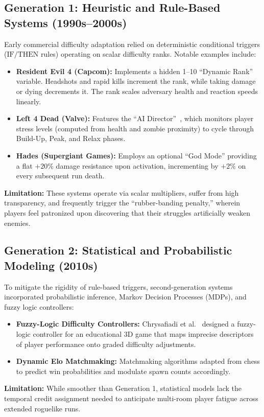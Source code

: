 \subsection{Generation 1: Heuristic and Rule-Based Systems (1990s--2000s)}
Early commercial difficulty adaptation relied on deterministic conditional triggers ($\text{IF}/\text{THEN}$ rules) operating on scalar difficulty ranks. Notable examples include:
\begin{itemize}
    \item \textbf{Resident Evil 4 (Capcom):} Implements a hidden 1--10 ``Dynamic Rank'' variable. Headshots and rapid kills increment the rank, while taking damage or dying decrements it. The rank scales adversary health and reaction speeds linearly.
    \item \textbf{Left 4 Dead (Valve):} Features the ``AI Director''~\cite{zohaib2018dynamic, mortazavi2024dda}, which monitors player stress levels (computed from health and zombie proximity) to cycle through Build-Up, Peak, and Relax phases.
    \item \textbf{Hades (Supergiant Games):} Employs an optional ``God Mode'' providing a flat $+20\%$ damage resistance upon activation, incrementing by $+2\%$ on every subsequent run death.
\end{itemize}
\textbf{Limitation:} These systems operate via scalar multipliers, suffer from high transparency, and frequently trigger the ``rubber-banding penalty,'' wherein players feel patronized upon discovering that their struggles artificially weaken enemies.

\subsection{Generation 2: Statistical and Probabilistic Modeling (2010s)}
To mitigate the rigidity of rule-based triggers, second-generation systems incorporated probabilistic inference, Markov Decision Processes (MDPs), and fuzzy logic controllers:
\begin{itemize}
    \item \textbf{Fuzzy-Logic Difficulty Controllers:} Chrysafiadi et al.~\cite{chrysafiadi2023fuzzy} designed a fuzzy-logic controller for an educational 3D game that maps imprecise descriptors of player performance onto graded difficulty adjustments.
    \item \textbf{Dynamic Elo Matchmaking:} Matchmaking algorithms adapted from chess to predict win probabilities and modulate spawn counts accordingly.
\end{itemize}
\textbf{Limitation:} While smoother than Generation 1, statistical models lack the temporal credit assignment needed to anticipate multi-room player fatigue across extended roguelike runs.

